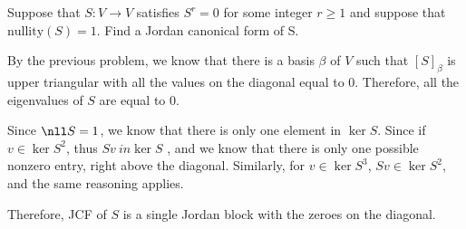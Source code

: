 \documentclass[11pt]{scrartcl}
\begin{document}
\begin{problem*}
Suppose that $S : V \to V$ satisfies $S^r = 0$ for some integer $r \ge 1$ and suppose that $\text{nullity}(S) = 1$. Find a Jordan canonical form of S.
\end{problem*}

\begin{soln}
  \hfill

  By the previous problem, we know that there is a basis $\beta$ of
  $V$ such that $[S]_{\beta}$ is upper triangular with all the values
  on the diagonal equal to 0. Therefore, all the eigenvalues of $S$
  are equal to 0.

  Since $\nll S = 1$, we know that there is only one element in
  $\ker S$. Since if $v\in \ker S^2$, thus $Sv\ in\ker S$ , and we
  know that there is only one possible nonzero entry, right above the
  diagonal. Similarly, for $v\in \ker S^3$, $Sv\in\ker S^2$, and the
  same reasoning applies.

  Therefore, JCF of $S$ is a single Jordan block with the zeroes on
  the diagonal.
\end{soln}
\end{document}
